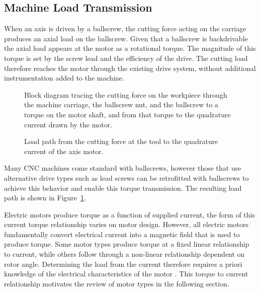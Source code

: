 \subsection{Machine Load Transmission}\label{machineLoad}
When an axis is driven by a ballscrew, the cutting force acting on the carriage produces an axial load on the ballscrew. Given that a ballscrew is backdrivable the axial load appears at the motor as a rotational torque. The magnitude of this torque is set by the screw lead and the efficiency of the drive. The cutting load therefore reaches the motor through the existing drive system, without additional instrumentation added to the machine. 
\begin{figure}[htbp]
	\centering
		{Block diagram tracing the cutting force on the workpiece through the machine carriage, the ballscrew nut, and the ballscrew to a torque on the motor shaft, and from that torque to the quadrature current drawn by the motor.}
	\caption[Load path from cutting force to motor current]{Load path from the cutting force at the tool to the quadrature current of the axis motor.}
	\label{fig:load_path}
\end{figure}
 Many CNC machines come standard with ballscrews, however those that use alternative drive types such as lead screws can be retrofitted with ballscrews to achieve this behavior and enable this torque transmission. The resulting load path is shown in Figure~\ref{fig:load_path}.

Electric motors produce torque as a function of supplied current, the form of this current torque relationship varies on motor design. However, all electric motors fundamentally convert electrical current into a magnetic field that is used to produce torque. Some motor types produce torque at a fixed linear relationship to current, while others follow through a non-linear relationship dependent on rotor angle. Determining the load from the current therefore requires a priori knowledge of the electrical characteristics of the motor \cite{binfet_implementation_2026,derammelaere_linear_2010,henke_modeling_2013}. This torque to current relationship motivates the review of motor types in the following section.

